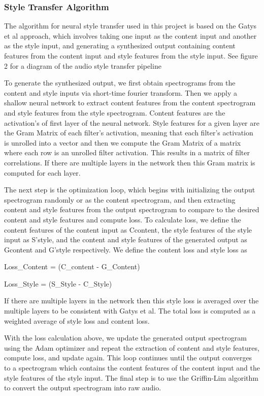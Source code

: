 \documentclass[10pt,twocolumn,letterpaper]{article}
\begin{document}
\subsubsection{Style Transfer Algorithm}

The algorithm for neural style transfer used in this project is based on the Gatys et al\cite{Authors00001} approach, which involves taking one input as the content input and another as the style input, and generating a synthesized output containing content features from the content input and style features from the style input. See figure 2 for a diagram of the audio style transfer pipeline

To generate the synthesized output, we first obtain spectrograms from the content and style inputs via short-time fourier transform. Then we apply a shallow neural network to extract content features from the content spectrogram and style features from the style spectrogram. Content features are the activation's of first layer of the neural network. Style features for a given layer are the Gram Matrix of each filter’s activation, meaning that each filter’s activation is unrolled into a vector and then we compute the Gram Matrix of a matrix where each row is an unrolled filter activation. This results in a matrix of filter correlations. If there are multiple layers in the network then this Gram matrix is 
computed for each layer.

The next step is the optimization loop, which begins with initializing the output spectrogram randomly or as the content spectrogram, and then extracting content and style features from the output spectrogram to compare to the desired content and style features and compute loss. To calculate loss, we define the content features of the content input as Ccontent, the style features of the style input as S'style, and the content and style features of the generated output as Gcontent and G'style respectively. We define the content loss  and style loss as

Loss_Content = (C_content - G_Content)

Loss_Style = (S_Style - C_Style)
 
If there are multiple layers in the network then this style loss is averaged over the multiple layers to be consistent with Gatys et al. The total loss is computed as a weighted average of style loss and content loss.

With the loss calculation above, we update the generated output spectrogram using the Adam optimizer \cite{Authors00008}and repeat the extraction of content and style features, compute loss, and update again. This loop continues until the output converges to a spectrogram which contains the content features of the content input and the style features of the style input. The final step is to use the Griffin-Lim algorithm\cite{Authors00004} to convert the output spectrogram into raw audio.
\end{document}
